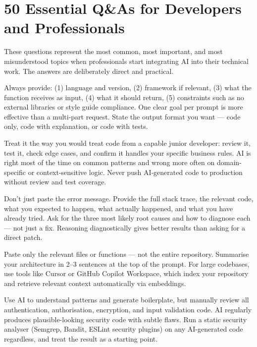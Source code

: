 \chapter{50 Essential Q\&As for Developers and Professionals}
\label{ch:dev-qa}

These questions represent the most common, most important, and most misunderstood
topics when professionals start integrating AI into their technical work.
The answers are deliberately direct and practical.

{Always provide: (1) language and version, (2) framework if relevant, (3) what
the function receives as input, (4) what it should return, (5) constraints such as no
external libraries or style guide compliance.
One clear goal per prompt is more effective than a multi-part request.
State the output format you want --- code only, code with explanation, or code with
tests.}

{Treat it the way you would treat code from a capable junior developer: review it,
test it, check edge cases, and confirm it handles your specific business rules.
AI is right most of the time on common patterns and wrong more often on
domain-specific or context-sensitive logic.
Never push AI-generated code to production without review and test coverage.}

{Don't just paste the error message.
Provide the full stack trace, the relevant code, what you expected to happen, what
actually happened, and what you have already tried.
Ask for the three most likely root causes and how to diagnose each --- not just a fix.
Reasoning diagnostically gives better results than asking for a direct patch.}

{Paste only the relevant files or functions --- not the entire repository.
Summarise your architecture in 2--3 sentences at the top of the prompt.
For large codebases, use tools like Cursor or GitHub Copilot Workspace, which index
your repository and retrieve relevant context automatically via embeddings.}

{Use AI to understand patterns and generate boilerplate, but manually review all
authentication, authorisation, encryption, and input validation code.
AI regularly produces plausible-looking security code with subtle flaws.
Run a static security analyser (Semgrep, Bandit, ESLint security plugins) on any
AI-generated code regardless, and treat the result as a starting point.}

